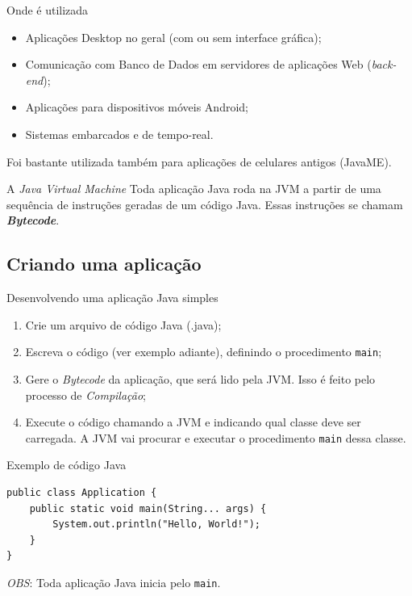 \documentclass{beamer}
\begin{document}
\begin{frame}{Onde é utilizada}
    \begin{itemize}
        \item Aplicações Desktop no geral (com ou sem interface gráfica);
        \item Comunicação com Banco de Dados em servidores de aplicações Web
            (\textit{back-end});
        \item Aplicações para dispositivos móveis Android;
        \item Sistemas embarcados e de tempo-real.
    \end{itemize}

    Foi bastante utilizada também para aplicações de celulares antigos (JavaME).
\end{frame}


\begin{frame}{A \textit{Java Virtual Machine}}
    Toda aplicação Java roda na JVM a partir de uma sequência de instruções
    geradas de um código Java. Essas instruções se chamam
    \textbf{\textit{Bytecode}}.
\end{frame}


\subsection{Criando uma aplicação}

\begin{frame}{Desenvolvendo uma aplicação Java simples}
    \begin{enumerate}
        \item Crie um arquivo de código Java (.java);
        \item Escreva o código (ver exemplo adiante), definindo o procedimento
            \texttt{main};
        \item Gere o \textit{Bytecode} da aplicação, que será lido pela JVM\@.
            Isso é feito pelo processo de \emph{Compilação};
        \item Execute o código chamando a JVM e indicando qual classe deve ser
            carregada. A JVM vai procurar e executar o procedimento
            \texttt{main} dessa classe.
    \end{enumerate}
\end{frame}


\begin{frame}[fragile]{Exemplo de código Java}
    \begin{verbatim}
public class Application {
    public static void main(String... args) {
        System.out.println("Hello, World!");
    }
}
    \end{verbatim}

    \emph{OBS}: Toda aplicação Java inicia pelo \texttt{main}.
\end{frame}
\end{document}
